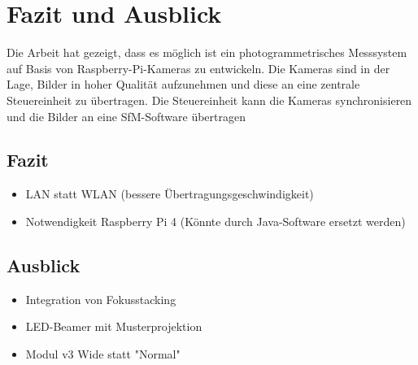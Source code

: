 \documentclass[./00PhotoBox.tex]{subfiles}
\begin{document}
\chapter{Fazit und Ausblick}

Die Arbeit hat gezeigt, dass es möglich ist ein photogrammetrisches Messsystem auf Basis von Raspberry-Pi-Kameras zu entwickeln. Die Kameras sind in der Lage, Bilder in hoher Qualität aufzunehmen und diese an eine zentrale Steuereinheit zu übertragen. Die Steuereinheit kann die Kameras synchronisieren und die Bilder an eine \gls{SfM}-Software übertragen

\section{Fazit}
\begin{itemize}
  \item LAN statt WLAN (bessere Übertragungsgeschwindigkeit)
  \item Notwendigkeit Raspberry Pi 4 (Könnte durch Java-Software ersetzt werden)
\end{itemize}

\section{Ausblick}
\begin{itemize}
  \item Integration von Fokusstacking
  \item LED-Beamer mit Musterprojektion
  \item Modul v3 Wide statt "Normal"
\end{itemize}

\biblio
\end{document}
